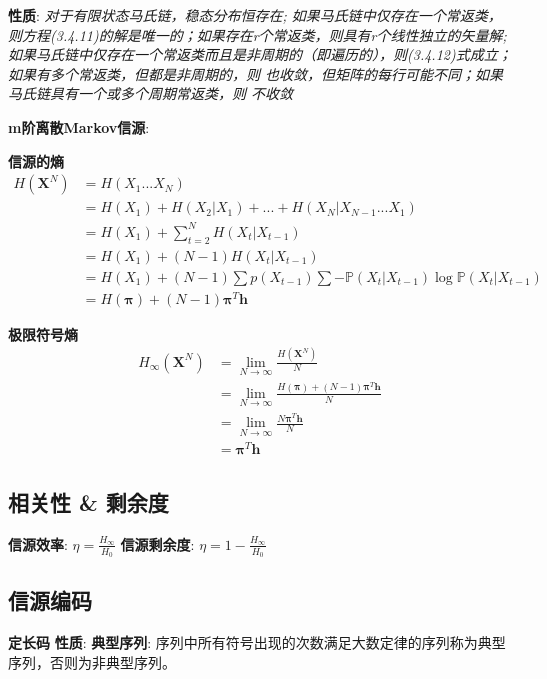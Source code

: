 \documentclass{article}
\newcommand{\env}[2]{\begin{#1}#2\end{#1}}
\begin{document}
                \textbf{性质}: \textit{对于有限状态马氏链，稳态分布恒存在; 如果马氏链中仅存在一个常返类，则方程(3.4.11)的解是唯一的；如果存在r个常返类，则具有r个线性独立的矢量解; 如果马氏链中仅存在一个常返类而且是非周期的（即遍历的），则(3.4.12)式成立；如果有多个常返类，但都是非周期的，则       也收敛，但矩阵的每行可能不同；如果马氏链具有一个或多个周期常返类，则      不收敛}

        \textbf{m阶离散Markov信源}:
        
            \textbf{信源的熵}
            \env{align*}{
                H(\boldsymbol X^N) &= H(X_1 ... X_N)\\
                &= H(X_1) + H(X_2|X_1) + ... + H(X_N | X_{N-1} ... X_{1}) \tag{条件熵展开}\\
                &= H(X_1) + \sum\limits_{t=2}^N H(X_t | X_{t-1}) \tag{Markov性}\\
                &= H(X_1) + (N-1) H(X_t | X_{t-1}) \tag{平稳性}\\
                &= H(X_1) + (N-1) \sum p(X_{t-1}) \sum - \mathbb P(X_t | X_{t-1}) \log \mathbb P(X_t | X_{t-1}) \tag{条件熵代入}\\
                &= H(\boldsymbol \pi) + (N-1)  \boldsymbol \pi^T \boldsymbol h \tag{平稳分布$\boldsymbol \pi$代入}
            }
            
            \textbf{极限符号熵}
            \env{align*}{
                H_\infty(\boldsymbol X^N) &= \lim\limits_{N \to \infty}\frac{H(\boldsymbol X^N)}{N} \tag{定义}\\
                &= \lim\limits_{N \to \infty} \frac{H(\boldsymbol \pi) + (N-1)  \boldsymbol \pi^T \boldsymbol h}{N} \tag{代入}\\
                &= \lim\limits_{N \to \infty} \frac{N \boldsymbol \pi^T \boldsymbol h}{N} \tag{省略$\to 0$量}\\
                &= \boldsymbol \pi^T \boldsymbol h
            }

    \subsection{相关性 \& 剩余度}
        \textbf{信源效率}: $\eta = \frac{H_\infty}{H_0}$
        \textbf{信源剩余度}: $\eta = 1 - \frac{H_\infty}{H_0}$
            
    \subsection{信源编码}
        \textbf{定长码}
            \textbf{性质}:
                \textbf{典型序列}: 序列中所有符号出现的次数满足大数定律的序列称为典型序列，否则为非典型序列。
\end{document}
